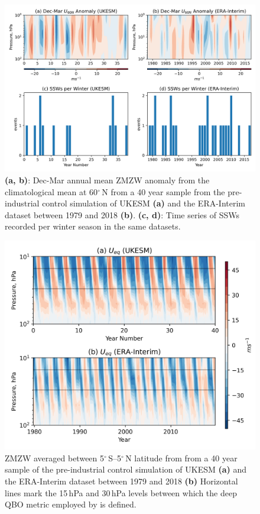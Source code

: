 \documentclass[wcd, manuscript]{copernicus}
\begin{document}
\begin{center}
\begin{figure}[h!]
\noindent\includegraphics[width = \linewidth]{figures/SSW_series_fig1.png}
\caption{\textbf{(a, b)}: Dec-Mar annual mean ZMZW anomaly from the climatological mean at 60$^\circ$\,N from a 40 year sample from the pre-industrial control simulation of UKESM \textbf{(a)} and the ERA-Interim dataset between 1979 and 2018 \textbf{(b)}. \textbf{(c, d)}: Time series of SSWs recorded per winter season in the same datasets.}
\label{fig1}
\end{figure}
\end{center}


\begin{center}
\begin{figure}[h!]
\noindent\includegraphics[width = 0.8\linewidth]{figures/QBOs.png}
\caption{ZMZW averaged between 5$^{\circ}$\,S--5$^{\circ}$\,N latitude from from a 40 year sample of the pre-industrial control simulation of UKESM \textbf{(a)} and the ERA-Interim dataset between 1979 and 2018 \textbf{(b)} Horizontal lines mark the 15\,hPa and 30\,hPa levels between which the deep QBO metric employed by \cite{Andrews2019} is defined.}
\label{fig1}
\end{figure}
\end{center}
\end{document}
